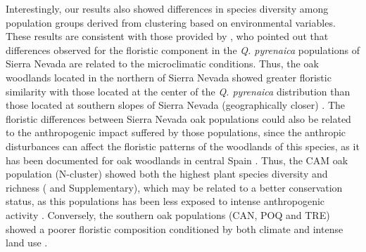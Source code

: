 Interestingly, our results also showed differences in species diversity among population groups derived from clustering based on environmental variables. These results are consistent with those provided by \textcite{Loriteetal2008PhytosociologicalReview}, who pointed out that differences observed for the floristic component in the \emph{Q. pyrenaica} populations of Sierra Nevada are related to the microclimatic conditions. Thus, the oak woodlands located in the northern of Sierra Nevada showed greater floristic similarity with those located at the center of the \emph{Q. pyrenaica} distribution than those located at southern slopes of Sierra Nevada (geographically closer) \autocite{Loriteetal2008PhytosociologicalReview}. The floristic differences between Sierra Nevada oak populations could also be related to the anthropogenic impact suffered by those populations, since the anthropic disturbances can affect the floristic patterns of the woodlands of this species, as it has been documented for oak woodlands in central Spain \autocite{Gavilanetal2000EffectsDisturbance}. Thus, the CAM oak population (N-cluster) showed both the highest plant species diversity and richness ( and Supplementary), which may be related to a better conservation status, as this populations has been less exposed to intense anthropogenic activity \autocite{JimenezOlivencia1991PaisajesSierra}. Conversely, the southern oak populations (CAN, POQ and TRE) showed a poorer floristic composition conditioned by both climate and intense land use \autocite{CamachoOlmedoetal2002DinamicaEvolutiva,AlAallalietal1998EstudioVegetacion}.

